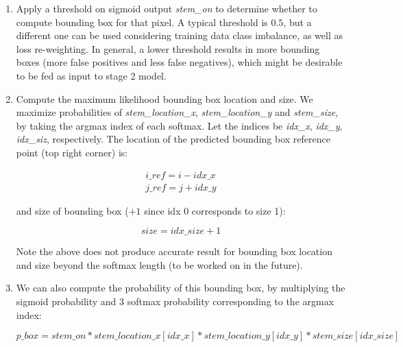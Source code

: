 \documentclass[12pt]{article}
\begin{document}
\begin{enumerate}
    \item Apply a threshold on sigmoid output \textit{stem\_on} to determine whether to compute bounding box for that pixel.
    A typical threshold is $0.5$, but a different one can be used considering training data class imbalance,
    as well as loss re-weighting.
    In general, a lower threshold results in more bounding boxes (more false positives and less false negatives),
    which might be desirable to be fed as input to stage 2 model.
    \item Compute the maximum likelihood bounding box location and size.
    We maximize probabilities of \textit{stem\_location\_x}, \textit{stem\_location\_y} and \textit{stem\_size},
    by taking the argmax index of each softmax.
    Let the indices be \textit{idx\_x}, \textit{idx\_y}, \textit{idx\_siz}, respectively.
    The location of the predicted bounding box reference point (top right corner) is:

    \begin{equation}
        \begin{align}
            i\_ref = i - idx\_x \\
            j\_ref = j + idx\_y
        \end{align}
    \end{equation}

    and size of bounding box ($+1$ since idx 0 corresponds to size 1):

    \begin{equation}
        size = idx\_size + 1
    \end{equation}

    Note the above does not produce accurate result for bounding box location and size beyond the softmax length (to be worked on in the future).

    \item We can also compute the probability of this bounding box,
    by multiplying the sigmoid probability and 3 softmax probability corresponding to the argmax index:

    \begin{equation}
        p\_box = stem\_on * stem\_location\_x[idx\_x] * stem\_location\_y[idx\_y] * stem\_size[idx\_size]
    \end{equation}

\end{enumerate}
\end{document}

